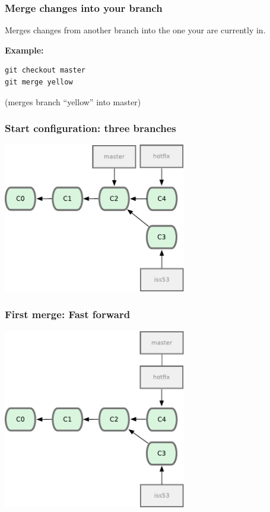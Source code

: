 \documentclass{gittalk}
\begin{document}
\begin{frame}[fragile]
\frametitle{Merge changes into your branch}
\begin{tcolorbox}[title=git merge]
Merges changes from another branch into the one your are currently in.
\end{tcolorbox}
\vspace*{1em}
\textbf{Example:}
\begin{lstlisting}
git checkout master
git merge yellow
\end{lstlisting}
(merges branch \enquote{yellow} into master)
\end{frame}

\begin{frame}
  \frametitle{Start configuration: three branches}
\begin{center}
  \includegraphics[width=0.6\textwidth]{./img/fig0313.pdf}
\end{center}
\end{frame}

\begin{frame}
  \frametitle{First merge: Fast forward}
\begin{center}
  \includegraphics[width=0.6\textwidth]{./img/fig0314.pdf}
\end{center}
\end{frame}
\end{document}
